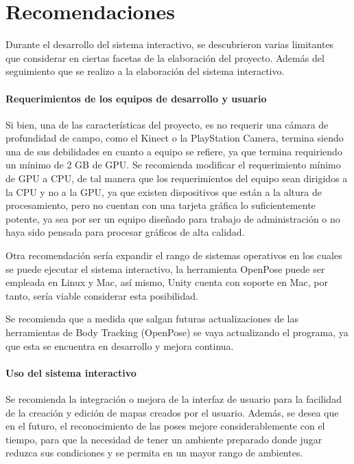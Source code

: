 \chapter{Recomendaciones}

Durante el desarrollo del sistema interactivo, se descubrieron varias limitantes que considerar en ciertas facetas de la elaboración del proyecto. Además del seguimiento que se realizo a la elaboración del sistema interactivo.

\subsubsection{Requerimientos de los equipos de desarrollo y usuario}

Si bien, una de las características del proyecto, es no requerir una cámara de profundidad de campo, como el Kinect o la PlayStation Camera, termina siendo una de sus debilidades en cuanto a equipo se refiere, ya que termina requiriendo un mínimo de 2 GB de GPU. Se recomienda modificar el requerimiento mínimo de GPU a CPU, de tal manera que los requerimientos del equipo sean dirigidos a la CPU y no a la GPU, ya que existen dispositivos que están a la altura de procesamiento, pero no cuentan con una tarjeta gráfica lo suficientemente potente, ya sea por ser un equipo diseñado para trabajo de administración o no haya sido pensada para procesar gráficos de alta calidad.

Otra recomendación sería expandir el rango de sistemas operativos en los cuales se puede ejecutar el sistema interactivo, la herramienta OpenPose puede ser empleada en Linux y Mac, así mismo, Unity cuenta con soporte en Mac, por tanto, sería viable considerar esta posibilidad.

Se recomienda que a medida que salgan futuras actualizaciones de las herramientas de Body Tracking (OpenPose) se vaya actualizando el programa, ya que esta se encuentra en desarrollo y mejora continua. 

\subsubsection{Uso del sistema interactivo}

Se recomienda la integración o mejora de la interfaz de usuario para la facilidad de la creación y edición de mapas creados por el usuario. Además, se desea que en el futuro, el reconocimiento de las poses mejore considerablemente con el tiempo, para que la necesidad de tener un ambiente preparado donde jugar reduzca sus condiciones y se permita en un mayor rango de ambientes.



